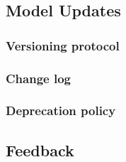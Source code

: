\documentclass{article}
\begin{document}
\subsection{Model Updates}
\subsubsection{Versioning protocol}


\subsubsection{Change log}


\subsubsection{Deprecation policy}


\subsection{Feedback}
\end{document}
